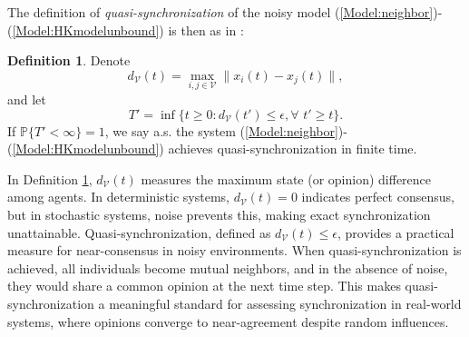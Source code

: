 \documentclass[11pt]{article}
\theoremstyle{definition}
\newtheorem{defn}[thm]{Definition}
\theoremstyle{remark}
\numberwithin{equation}{section}
\begin{document}
The definition of \emph{quasi-synchronization} of the noisy model (\ref{Model:neighbor})-(\ref{Model:HKmodelunbound}) is then as in \cite{Su2017auto}:
\begin{defn}\label{robconsen}
Denote
\begin{equation}\label{Equa:defdVt}
  d_{\mathcal{V}}(t)=\max\limits_{i, j\in \mathcal{V}}\|x_i(t)-x_j(t)\|,
\end{equation}
and let
\begin{equation}\label{Equa:defTquasisyn}
  T'=\inf\{t\geq 0: d_{\mathcal{V}}(t')\leq \epsilon, \forall\,\, t'\geq t\}.
\end{equation}
If $\mathbb{P}\{T'<\infty\}=1$, we say a.s. the system (\ref{Model:neighbor})-(\ref{Model:HKmodelunbound}) achieves quasi-synchronization in finite time.
\end{defn}
In Definition \ref{robconsen}, $d_{\mathcal{V}}(t)$ measures the maximum state (or opinion) difference among agents. In deterministic systems, $d_{\mathcal{V}}(t)=0$ indicates perfect consensus, but in stochastic systems, noise prevents this, making exact synchronization unattainable. Quasi-synchronization, defined as $d_{\mathcal{V}}(t)\leq\epsilon$, provides a practical measure for near-consensus in noisy environments. When quasi-synchronization is achieved, all individuals become mutual neighbors, and in the absence of noise, they would share a common opinion at the next time step. This makes quasi-synchronization a meaningful standard for assessing synchronization in real-world systems, where opinions converge to near-agreement despite random influences.
\end{document}
